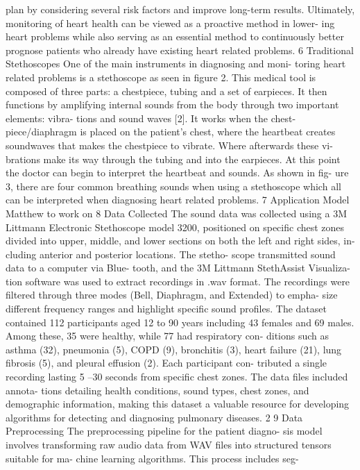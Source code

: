 plan by considering several risk factors and improve
long-term results. Ultimately, monitoring of heart
health can be viewed as a proactive method in lower-
ing heart problems while also serving as an essential
method to continuously better prognose patients who
already have existing heart related problems.
6 Traditional Stethoscopes
One of the main instruments in diagnosing and moni-
toring heart related problems is a stethoscope as seen
in figure 2. This medical tool is composed of three
parts: a chestpiece, tubing and a set of earpieces.
It then functions by amplifying internal sounds from
the body through two important elements: vibra-
tions and sound waves [2]. It works when the chest-
piece/diaphragm is placed on the patient’s chest,
where the heartbeat creates soundwaves that makes
the chestpiece to vibrate. Where afterwards these vi-
brations make its way through the tubing and into
the earpieces. At this point the doctor can begin to
interpret the heartbeat and sounds. As shown in fig-
ure 3, there are four common breathing sounds when
using a stethoscope which all can be interpreted when
diagnosing heart related problems.
7 Application Model
Matthew to work on
8 Data Collected
The sound data was collected using a 3M Littmann
Electronic Stethoscope model 3200, positioned on
specific chest zones divided into upper, middle, and
lower sections on both the left and right sides, in-
cluding anterior and posterior locations. The stetho-
scope transmitted sound data to a computer via Blue-
tooth, and the 3M Littmann StethAssist Visualiza-
tion software was used to extract recordings in .wav
format. The recordings were filtered through three
modes (Bell, Diaphragm, and Extended) to empha-
size different frequency ranges and highlight specific
sound profiles.
The dataset contained 112 participants aged 12 to
90 years including 43 females and 69 males. Among
these, 35 were healthy, while 77 had respiratory con-
ditions such as asthma (32), pneumonia (5), COPD
(9), bronchitis (3), heart failure (21), lung fibrosis
(5), and pleural effusion (2). Each participant con-
tributed a single recording lasting 5 –30 seconds from
specific chest zones. The data files included annota-
tions detailing health conditions, sound types, chest
zones, and demographic information, making this
dataset a valuable resource for developing algorithms
for detecting and diagnosing pulmonary diseases.
2
9 Data Preprocessing
The preprocessing pipeline for the patient diagno-
sis model involves transforming raw audio data from
WAV files into structured tensors suitable for ma-
chine learning algorithms. This process includes seg-
